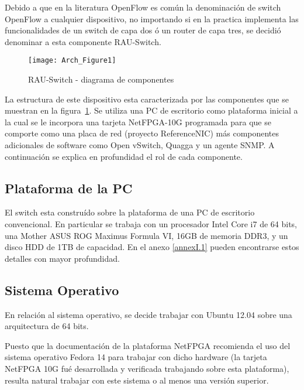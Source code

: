 Debido a que en la literatura OpenFlow es común la denominación de switch OpenFlow a cualquier dispositivo, no importando si en la practica implementa las funcionalidades de un switch de capa dos \'o un router de capa tres, se decidió denominar a esta componente RAU-Switch.\\

\begin{figure}[h] 
\centering    
\texttt{[image: Arch\_Figure1]}
\caption[RAU-Switch - diagrama de componentes]{RAU-Switch - diagrama de componentes}
\label{fig:OpenSourceRArch}
\end{figure}

La estructura de este dispositivo esta caracterizada por las componentes que se muestran en la figura~\ref{fig:OpenSourceRArch}. Se utiliza una PC de escritorio como plataforma inicial a la cual se le incorpora una tarjeta NetFPGA-10G programada para que se comporte como una placa de red (proyecto ReferenceNIC) m\'as componentes adicionales de software como Open vSwitch, Quagga y un agente SNMP. A continuaci\'on se explica en profundidad el rol de cada componente.

\subsection{Plataforma de la PC}
El switch esta constru\'ido sobre la plataforma de una PC de escritorio convencional. En particular se trabaja con un procesador Intel Core i7 de 64 bits, una Mother ASUS ROG Maximus Formula VI, 16GB de memoria DDR3, y un disco HDD de 1TB de capacidad. En el anexo \ref{annexI.1} pueden encontrarse estos detalles con mayor profundidad.

\subsection{Sistema Operativo}
En relación al sistema operativo, se decide trabajar con Ubuntu 12.04 sobre una arquitectura de 64 bits. %

Puesto que la documentaci\'on de la plataforma NetFPGA recomienda el uso del sistema operativo Fedora 14 para trabajar con dicho hardware (la tarjeta NetFPGA 10G fu\'e desarrollada y verificada trabajando sobre esta plataforma), resulta natural trabajar con este sistema o al menos una versi\'on superior. 

